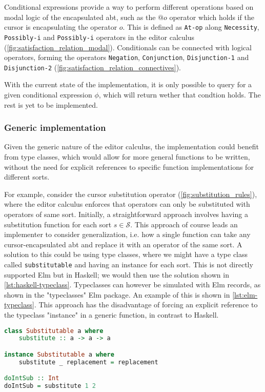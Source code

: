 \documentclass[sigplan,review]{acmart}
\newcommand{\abt}{\textsf{abt}\xspace}
\begin{document}
Conditional expressions provide a way to perform different operations based on
modal logic of the encapsulated \abt, such as the $@o$ operator which holds
if the cursor is encapsulating the operator $o$. This is defined as \texttt{At-op}
along \texttt{Necessity}, \texttt{Possibly-i} and \texttt{Possibly-i} operators
in the editor calculus (\cref{fig:satisfaction_relation_modal}). Conditionals
can be connected with logical operators, forming the operators \texttt{Negation},
\texttt{Conjunction}, \texttt{Disjunction-1} and \texttt{Disjunction-2}
(\cref{fig:satisfaction_relation_connectives}).

With the current state of the implementation, it is only possible to query for a given conditional expression $\phi$, which will return wether that condtion holds. The rest is yet to be implemented.

\subsubsection{Generic implementation}
Given the generic nature of the editor calculus, the implementation could
benefit from type classes, which would allow for more general functions
to be written, without the need for explicit references to specific
function implementations for different sorts.

For example, consider the cursor substitution operator
(\cref{fig:substitution_rules}), where the editor calculus enforces
that operators can only be substituted with operators of same
sort. Initially, a straightforward approach involves having a
substitution function for each sort $s \in \mathcal{S}$.  This
approach of course leads an implementer to consider generalization,
i.e. how a single function can take any cursor-encapsulated \abt and
replace it with an operator of the same sort. A solution to this could
be using type classes, where we might have a type class called
\texttt{substitutable} and having an instance for each sort.  This is
not directly supported Elm but in Haskell; we would then use the
solution shown in \cref{lst:haskell-typeclass}.  Typeclasses can
however be simulated with Elm records, as shown in the "typeclasses"
Elm package\cite{elm-typeclass-package}.  An example of this is shown
in \cref{lst:elm-typeclass}.  This approach has the disadvantage of
forcing an explicit reference to the typeclass "instance" in a generic
function, in contrast to Haskell.


\begin{lstlisting}[language=Haskell,style=inline,caption={Haskell typeclass example},label={lst:haskell-typeclass}]
class Substitutable a where
    substitute :: a -> a -> a

instance Substitutable a where
    substitute _ replacement = replacement

doIntSub :: Int
doIntSub = substitute 1 2
\end{lstlisting}
\end{document}
